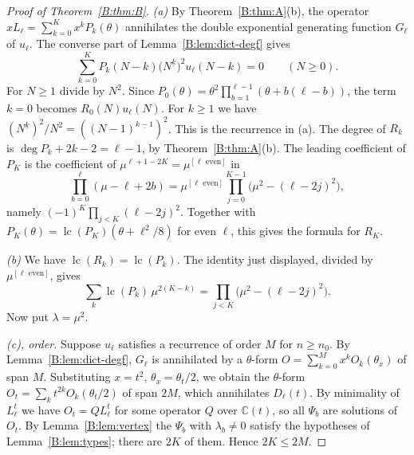 \documentclass[11pt,a4paper]{article}
\theoremstyle{definition}
\theoremstyle{remark}
\newcommand{\C}{\mathbb C}
\newcommand{\ff}[2]{#1^{\underline{#2}}}
\DeclareMathOperator{\lc}{lc}
\numberwithin{equation}{section}
\begin{document}
\begin{proof}[Proof of Theorem~\ref{B:thm:B}]
\emph{(a)} By Theorem~\ref{B:thm:A}(b), the operator $xL_\ell=\sum_{k=0}^{K}x^kP_k(\theta)$ annihilates the double exponential generating function $G_\ell$ of $u_\ell$. The converse part of Lemma~\ref{B:lem:dict-degf} gives
\[
\sum_{k=0}^{K}P_k(N-k)\bigl(\ff{N}{k}\bigr)^2u_\ell(N-k)=0\qquad(N\ge0).
\]
For $N\ge1$ divide by $N^2$. Since $P_0(\theta)=\theta^2\prod_{b=1}^{\ell-1}(\theta+b(\ell-b))$, the term $k=0$ becomes $R_0(N)u_\ell(N)$. For $k\ge1$ we have $(\ff{N}{k})^2/N^2=(\ff{(N-1)}{k-1})^2$. This is the recurrence in (a). The degree of $R_k$ is $\deg P_k+2k-2=\ell-1$, by Theorem~\ref{B:thm:A}(b). The leading coefficient of $P_K$ is the coefficient of $\mu^{\ell+1-2K}=\mu^{[\ell\text{ even}]}$ in
\[
\prod_{b=0}^{\ell}(\mu-\ell+2b)=\mu^{[\ell\text{ even}]}\prod_{j=0}^{K-1}\bigl(\mu^2-(\ell-2j)^2\bigr),
\]
namely $(-1)^K\prod_{j<K}(\ell-2j)^2$. Together with $P_K(\theta)=\lc(P_K)(\theta+\ell^2/8)$ for even $\ell$, this gives the formula for $R_K$.

\emph{(b)} We have $\lc(R_k)=\lc(P_k)$. The identity just displayed, divided by $\mu^{[\ell\text{ even}]}$, gives
\[
\sum_k\lc(P_k)\,\mu^{2(K-k)}=\prod_{j<K}\bigl(\mu^2-(\ell-2j)^2\bigr).
\]
Now put $\lambda=\mu^2$.

\emph{(c), order.} Suppose $u_\ell$ satisfies a recurrence of order $M$ for $n\ge n_0$. By Lemma~\ref{B:lem:dict-degf}, $G_\ell$ is annihilated by a $\theta$-form $O=\sum_{k=0}^{M}x^kO_k(\theta_x)$ of span $M$. Substituting $x=t^2$, $\theta_x=\theta_t/2$, we obtain the $\theta$-form $O_t=\sum_kt^{2k}O_k(\theta_t/2)$ of span $2M$, which annihilates $D_\ell(t)$. By minimality of $L^t_\ell$ we have $O_t=QL^t_\ell$ for some operator $Q$ over $\C(t)$, so all $\Psi_b$ are solutions of $O_t$. By Lemma~\ref{B:lem:vertex} the $\Psi_b$ with $\lambda_b\ne0$ satisfy the hypotheses of Lemma~\ref{B:lem:types}; there are $2K$ of them. Hence $2K\le2M$.


\end{proof}
\end{document}
